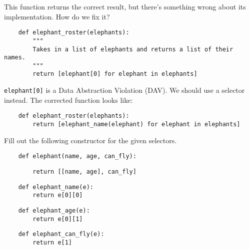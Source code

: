     
    \begin{blocksection}
    \question This function returns the correct result, but there's something wrong
    about its implementation. How do we fix it?
    
    \begin{lstlisting}
    def elephant_roster(elephants):
        """
        Takes in a list of elephants and returns a list of their names.
        """
        return [elephant[0] for elephant in elephants]
    \end{lstlisting}
    \begin{solution}[1in]
    \lstinline{elephant[0]} is a Data Abstraction Violation (DAV).
    We should use a selector instead.
    The corrected function looks like:
    \begin{lstlisting}
    def elephant_roster(elephants):
        return [elephant_name(elephant) for elephant in elephants]
    \end{lstlisting}
    \end{solution}
    
    \end{blocksection}
    
    
    \begin{blocksection}
    \question Fill out the following constructor for the given selectors.
    
    \begin{lstlisting}
    def elephant(name, age, can_fly):
    \end{lstlisting}
    \begin{solution}[1in]
    \begin{lstlisting}
        return [[name, age], can_fly]
    \end{lstlisting}
    \end{solution}
    
    \begin{lstlisting}
    def elephant_name(e):
        return e[0][0]
    \end{lstlisting}
    
    \begin{lstlisting}
    def elephant_age(e):
        return e[0][1]
    \end{lstlisting}
    
    \begin{lstlisting}
    def elephant_can_fly(e):
        return e[1]
    \end{lstlisting}
    
    \end{blocksection}
    

